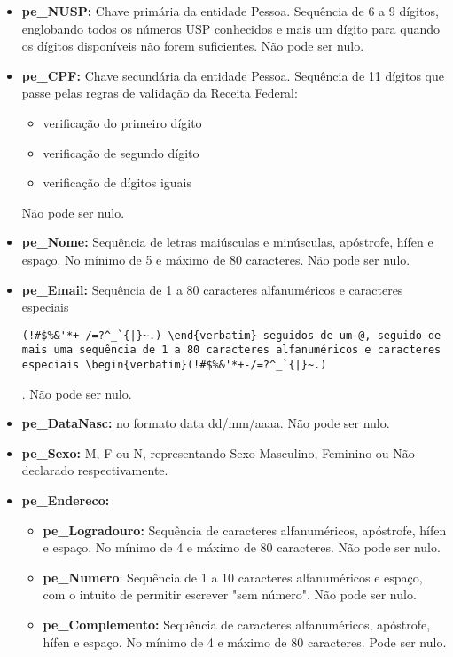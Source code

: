 \documentclass{report}
\begin{document}
\begin{itemize}
  \item \textbf{pe\_NUSP:} Chave primária da entidade Pessoa. Sequência de 6 a 9 dígitos, englobando todos os números USP conhecidos e mais um dígito para quando os dígitos disponíveis não forem suficientes. Não pode ser nulo.
  \item \textbf{pe\_CPF:} Chave secundária da entidade Pessoa. Sequência de 11 dígitos que passe pelas regras de validação da Receita Federal:
  \begin{itemize}
  	\item verificação do primeiro dígito
  	\item verificação de segundo dígito
  	\item verificação de dígitos iguais
  \end{itemize}
  Não pode ser nulo.
  \item \textbf{pe\_Nome:} Sequência de letras maiúsculas e minúsculas, apóstrofe, hífen e espaço. No mínimo de 5 e máximo de 80 caracteres. Não pode ser nulo.
  \item \textbf{pe\_Email:} Sequência de 1 a 80 caracteres alfanuméricos e caracteres especiais \begin{verbatim}(!#$%&'*+-/=?^_`{|}~.) \end{verbatim} seguidos de um @, seguido de mais uma sequência de 1 a 80 caracteres alfanuméricos e caracteres especiais \begin{verbatim}(!#$%&'*+-/=?^_`{|}~.)
  \end{verbatim} .
  Não pode ser nulo.
  \item \textbf{pe\_DataNasc:} no formato data dd/mm/aaaa. Não pode ser nulo.
  \item \textbf{pe\_Sexo:} M, F ou N, representando Sexo Masculino, Feminino ou Não declarado respectivamente.
  \item \textbf{pe\_Endereco:}
  \begin{itemize}
  	\item \textbf{pe\_Logradouro:} Sequência de caracteres alfanuméricos, apóstrofe, hífen e espaço. No mínimo de 4 e máximo de 80 caracteres. Não pode ser nulo.
  	\item \textbf{pe\_Numero}: Sequência de 1 a 10 caracteres alfanuméricos e espaço, com o intuito de permitir escrever "sem número". Não pode ser nulo.
  	\item \textbf{pe\_Complemento:} Sequência de caracteres alfanuméricos, apóstrofe, hífen e espaço. No mínimo de 4 e máximo de 80 caracteres. Pode ser nulo.

\end{itemize}
\end{itemize}
\end{document}

